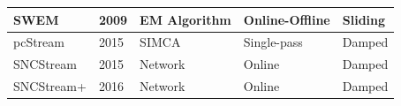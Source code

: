 \begin{table}[!ht]
\begin{tabular}{lllll}
SWEM                & 2009          & EM Algorithm      & Online-Offline      & Sliding              \\ \hline
pcStream            & 2015          & SIMCA             & Single-pass         & Damped               \\ \hline
SNCStream           & 2015          & Network           & Online              & Damped               \\ \hline
SNCStream+          & 2016          & Network           & Online              & Damped               \\ \hline \midrule
\end{tabular}
\end{table}












